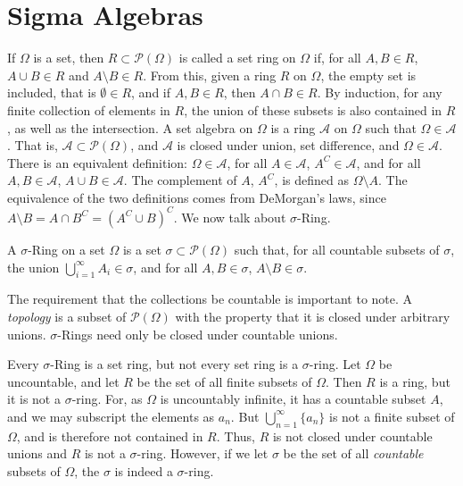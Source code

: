 \documentclass[crop=false,class=book,oneside]{standalone}
\begin{document}
    \section{Sigma Algebras}
        If $\Omega$ is a set, then $R\subset\mathcal{P}(\Omega)$
        is called a set ring on $\Omega$ if, for all
        $A,B\in{R}$, $A\cup{B}\in{R}$ and
        $A\setminus{B}\in{R}$. From this, given a ring $R$ on
        $\Omega$, the empty set is included, that is
        $\emptyset\in{R}$, and if $A,B\in{R}$, then
        $A\cap{B}\in{R}$. By induction, for any finite collection
        of elements in $R$, the union of these subsets is also
        contained in $R$, as well as the intersection. A set
        algebra on $\Omega$ is a ring $\mathcal{A}$
        on $\Omega$ such that $\Omega\in\mathcal{A}$. That is,
        $\mathcal{A}\subset\mathcal{P}(\Omega)$, and
        $\mathcal{A}$ is closed under union, set difference, and
        $\Omega\in\mathcal{A}$. There is an equivalent definition:
        $\Omega\in\mathcal{A}$, for all $A\in\mathcal{A}$,
        $A^{C}\in\mathcal{A}$, and for all $A,B\in\mathcal{A}$,
        $A\cup{B}\in\mathcal{A}$. The complement of $A$,
        $A^{C}$, is defined as $\Omega\setminus{A}$. The
        equivalence of the two definitions comes from DeMorgan's
        laws, since
        $A\setminus{B}=A\cap{B}^{C}=(A^{C}\cup{B})^{C}$. We now
        talk about $\sigma$-Ring.
        \begin{definition}
            A $\sigma$-Ring on a set $\Omega$ is a set
            $\sigma\subset\mathcal{P}(\Omega)$ such that,
            for all countable subsets of $\sigma$, the union
            $\bigcup_{i=1}^{\infty}A_{i}\in\sigma$, and for all
            $A,B\in\sigma$, $A\setminus{B}\in\sigma$.
        \end{definition}
        The requirement that the collections be countable is
        important to note. A \textit{topology} is a subset
        of $\mathcal{P}(\Omega)$ with the property that it is
        closed under arbitrary unions. $\sigma$-Rings need only
        be closed under countable unions.
        \begin{example}
            Every $\sigma$-Ring is a set ring, but not every
            set ring is a $\sigma$-ring. Let $\Omega$ be
            uncountable, and let $R$ be the set of all finite
            subsets of $\Omega$. Then $R$ is a ring, but it is
            not a $\sigma$-ring. For, as $\Omega$ is uncountably
            infinite, it has a countable subset $A$, and we
            may subscript the elements as $a_{n}$. But
            $\bigcup_{n=1}^{\infty}\{a_{n}\}$ is not a finite
            subset of $\Omega$, and is therefore not contained
            in $R$. Thus, $R$ is not closed under countable unions
            and $R$ is not a $\sigma$-ring. However, if we let
            $\sigma$ be the set of all \textit{countable} subsets
            of $\Omega$, the $\sigma$ is indeed a $\sigma$-ring.
        \end{example}
\end{document}
